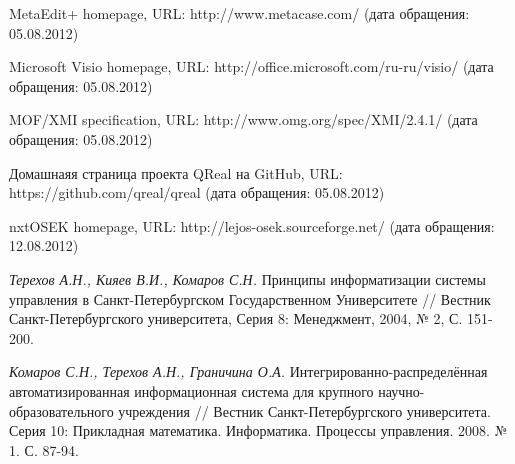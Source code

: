 \documentclass[a4paper]{article}
\begin{document}
\begin{thebibliography}{9001}
   MetaEdit+ homepage, URL: http://www.metacase.com/ (дата обращения: 05.08.2012)
  
   Microsoft Visio homepage, URL: http://office.microsoft.com/ru-ru/visio/ (дата обращения: 05.08.2012)
  
   MOF/XMI specification, URL: http://www.omg.org/spec/XMI/2.4.1/ (дата обращения: 05.08.2012)
  
   Домашнаяя страница проекта QReal на GitHub, URL: https://github.com/qreal/qreal (дата обращения: 05.08.2012)
  
   nxtOSEK homepage, URL: http://lejos-osek.sourceforge.net/ (дата обращения: 12.08.2012)
  
   \emph{Терехов А.Н., Кияев В.И., Комаров С.Н.} Принципы информатизации системы управления в Санкт-Петербургском Государственном Университете // Вестник Санкт-Петербургского университета, Серия 8: Менеджмент, 2004, № 2, С. 151-200.
  
   \emph{Комаров С.Н., Терехов А.Н., Граничина О.А.} Интегрированно-распределённая автоматизированная информационная система для крупного научно-образовательного учреждения // Вестник Санкт-Петербургского университета. Серия 10: Прикладная математика. Информатика. Процессы управления. 2008. № 1. С. 87-94. 

\end{thebibliography}
\end{document}
